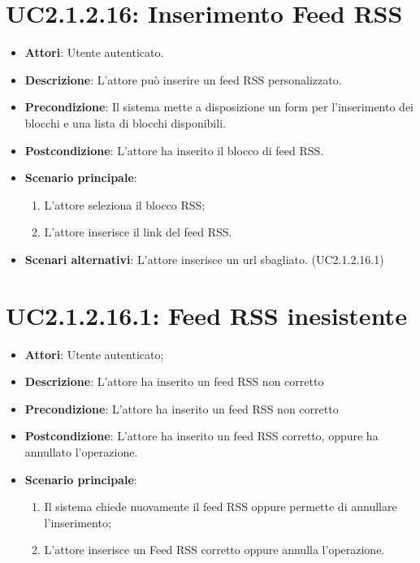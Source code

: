 \section{UC2.1.2.16: Inserimento Feed RSS}
\label{UC2.1.2.16}
\begin{itemize}
	\item \textbf{Attori}: Utente autenticato.
	\item \textbf{Descrizione}: L'attore può inserire un feed RSS personalizzato.
	\item \textbf{Precondizione}: Il sistema mette a disposizione un form per l'inserimento dei blocchi e una lista di blocchi disponibili.
	\item \textbf{Postcondizione}: L'attore ha inserito il blocco di feed RSS.
	\item \textbf{Scenario principale}:
	\begin{enumerate} \item L'attore seleziona il blocco RSS;  \item  L'attore inserisce il link del feed RSS.\end{enumerate}
	\item \textbf{Scenari alternativi}:
	L'attore inserisce un url sbagliato. (UC2.1.2.16.1)
\end{itemize}

\section{UC2.1.2.16.1: Feed RSS inesistente}
\label{UC2.1.2.16.1}
\begin{itemize}
	\item \textbf{Attori}: Utente autenticato;
	\item \textbf{Descrizione}: L'attore ha inserito un feed RSS non corretto
	\item \textbf{Precondizione}: L'attore ha inserito un feed RSS non corretto
	\item \textbf{Postcondizione}: L'attore ha inserito un feed RSS corretto, oppure ha annullato l'operazione.
	\item \textbf{Scenario principale}:
	\begin{enumerate} \item Il sistema chiede nuovamente il feed RSS oppure permette di annullare l'inserimento;  \item  L'attore inserisce un Feed RSS corretto oppure annulla l'operazione.\end{enumerate}
\end{itemize}

